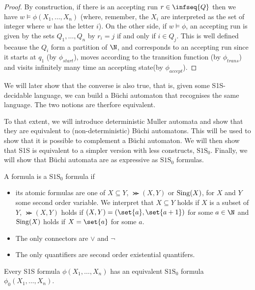 \begin{proof}
    By construction, if there is an accepting run $r \in \infseq{Q}$
    then we have $w \models \phi(X_1, \dots, X_n)$ (where, remember, the $X_i$
    are interpreted as the set of integer where $w$ has the letter $i$).
    On the other side, if $w \models \phi$, an accepting run
    is given by the sets $Q_1, \dots, Q_{n}$ by $r_i = j$
    if and only if $i \in Q_j$. This is well defined because the $Q_i$
    form a partition of $\N$, and corresponds to an accepting run
    since it starts at $q_1$ (by $\phi_{start}$),
    moves according to the transition function (by $\phi_{trans}$)
    and visits infinitely many time an accepting state(by $\phi_{accept}$).
\end{proof}

We will later show that the converse is also true,
that is, given some S1S-decidable language,
we can build a Büchi automaton that recognises the same
language. The two notions are therfore equivalent.

To that extent, we will introduce deterministic Muller
automata and show that they are equivalent to (non-deterministic)
Büchi automatons. This will be used to show
that it is possible to complement a Büchi automaton.
We will then show that S1S is equivalent
to a simpler version with less constructs, $\text{S1S}_0$.
Finally, we will show that Büchi automata are as expressive
as $\text{S1S}_0$ formulas.


\begin{definition}
    A formula is a $\text{S1S}_0$ formula if
    \begin{itemize}
        \item its atomic formulas are one of $X \subseteq Y$,
            $\Succ(X, Y)$ or $\mathrm{Sing}(X)$, for $X$ and $Y$ some second
            order variable. We interpret that $X \subseteq Y$ holds
            if $X$ is a subset of $Y$, $\Succ(X, Y)$ holds if
            $(X, Y) = (\set{a}, \set{a+1})$ for some $a \in \N$ and
            $\mathrm{Sing}(X)$ holds if $X = \set{a}$ for some $a$.
        \item The only connectors are $\vee$ and $\neg$
        \item The only quantifiers are second order existential quantifers.
    \end{itemize}
\end{definition}

\begin{lemma}
    \label{lemma:s1s-is-s1s-0}
    Every S1S formula $\phi(X_1, \dots, X_n)$ has
    an equivalent $\text{S1S}_0$ formula $\phi_0(X_1, \dots, X_n)$.
\end{lemma}


